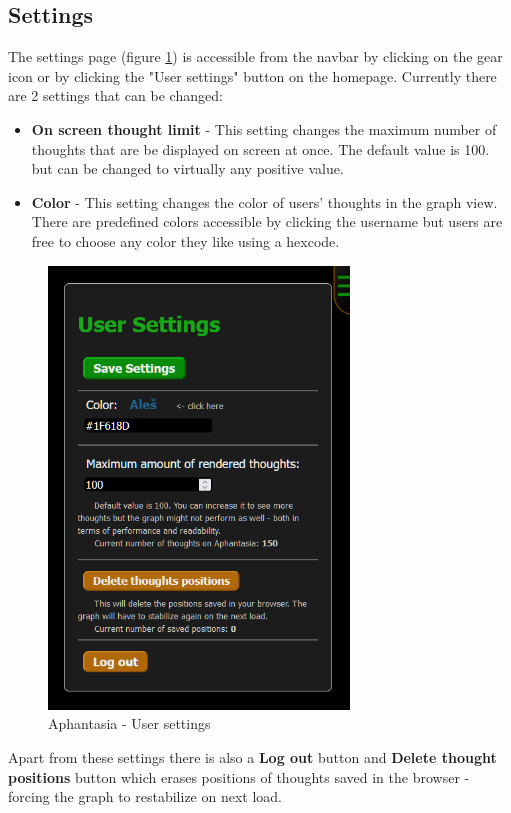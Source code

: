 \subsection{Settings}
The settings page (figure \ref{obr:afantazie_user_settings}) is accessible from the navbar by clicking on the gear icon or by clicking the "User settings" button on the homepage.
Currently there are 2 settings that can be changed:
\begin{itemize}
  \item \textbf{On screen thought limit} - This setting changes the maximum number of thoughts that are be displayed on screen at once.
  The default value is 100. but can be changed to virtually any positive value.
  \item \textbf{Color} - This setting changes the color of users' thoughts in the graph view.
  There are predefined colors accessible by clicking the username but users are free to choose any color they like using a hexcode.
\end{itemize}

\begin{figure}[p]\centering
  \includegraphics[width=80mm, keepaspectratio]{img/afantazie_user_settings.png}
  \caption{Aphantasia - User settings}
  \label{obr:afantazie_user_settings}
\end{figure}

Apart from these settings there is also a \textbf{Log out} button
and \textbf{Delete thought positions} button which erases positions of thoughts saved in the browser - forcing the graph to restabilize on next load.

